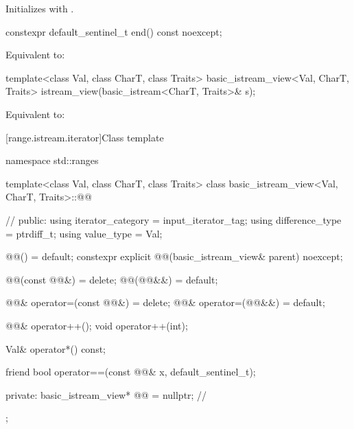 \begin{itemdescr}
\pnum
\effects
Initializes  with .
\end{itemdescr}

%
\begin{itemdecl}
constexpr default_sentinel_t end() const noexcept;
\end{itemdecl}

\begin{itemdescr}
\pnum
\effects
Equivalent to: 
\end{itemdescr}

%
\begin{itemdecl}
template<class Val, class CharT, class Traits>
basic_istream_view<Val, CharT, Traits> istream_view(basic_istream<CharT, Traits>& s);
\end{itemdecl}

\begin{itemdescr}
\pnum
\effects
Equivalent to: 
\end{itemdescr}

[range.istream.iterator]{Class template }

%
\begin{codeblock}
namespace std::ranges {
  template<class Val, class CharT, class Traits>
  class basic_istream_view<Val, CharT, Traits>::@@ {      // \expos
  public:
    using iterator_category = input_iterator_tag;
    using difference_type = ptrdiff_t;
    using value_type = Val;

    @@() = default;
    constexpr explicit @@(basic_istream_view& parent) noexcept;

    @@(const @@&) = delete;
    @@(@@&&) = default;

    @@& operator=(const @@&) = delete;
    @@& operator=(@@&&) = default;

    @@& operator++();
    void operator++(int);

    Val& operator*() const;

    friend bool operator==(const @@& x, default_sentinel_t);

  private:
    basic_istream_view* @@ = nullptr;                      // \expos
  };
}
\end{codeblock}


